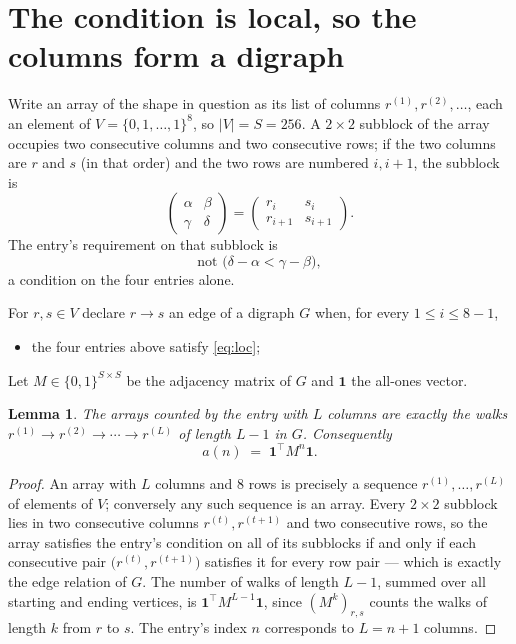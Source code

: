 \documentclass[11pt,a4paper]{article}
\theoremstyle{plain}
\newtheorem{lemma}[theorem]{Lemma}
\theoremstyle{definition}
\begin{document}
\section{The condition is local, so the columns form a digraph}

Write an array of the shape in question as its list of columns
$r^{(1)},r^{(2)},\dots$, each an element of
$V=\{0,1,\dots,1\}^{8}$, so $|V|=S=256$. A $2\times2$ subblock of the array
occupies two consecutive columns and two consecutive rows; if the two columns are $r$
and $s$ (in that order) and the two rows are numbered $i,i+1$,
the subblock is
\[
\begin{pmatrix}\alpha&\beta\\\gamma&\delta\end{pmatrix}=\begin{pmatrix}r_i&s_i\\r_{i+1}&s_{i+1}\end{pmatrix}.
\]
The entry's requirement on that subblock is
\begin{equation}\label{eq:loc}
\text{not }\bigl(\delta-\alpha<\gamma-\beta\bigr),
\end{equation}
a condition on the four entries alone.

For $r,s\in V$ declare $r\to s$ an edge of a digraph $G$ when, for every
$1\le i\le 8-1$,
\begin{itemize}
\item the four entries above satisfy \eqref{eq:loc};

\end{itemize}
Let $M\in\{0,1\}^{S\times S}$ be the adjacency matrix of $G$ and $\mathbf{1}$ the
all-ones vector.

\begin{lemma}\label{lem:walk}
The arrays counted by the entry with $L$ columns are exactly the walks
$r^{(1)}\to r^{(2)}\to\cdots\to r^{(L)}$ of length $L-1$ in $G$. Consequently
\[
a(n)\;=\;\mathbf{1}^{\!\top}M^{n}\mathbf{1} .
\]
\end{lemma}

\begin{proof}
An array with $L$ columns and $8$ rows is precisely a sequence
$r^{(1)},\dots,r^{(L)}$ of elements of $V$; conversely any such sequence is an array.
Every $2\times2$ subblock lies in two consecutive columns $r^{(t)},r^{(t+1)}$ and two
consecutive rows, so the array satisfies the entry's condition on all of its subblocks
if and only if each consecutive pair $\bigl(r^{(t)},r^{(t+1)}\bigr)$ satisfies it for
every row pair --- which is exactly the edge relation of $G$. The number of walks of
length $L-1$, summed over all starting and ending vertices, is
$\mathbf{1}^{\!\top}M^{L-1}\mathbf{1}$, since $(M^{k})_{r,s}$ counts the walks of
length $k$ from $r$ to $s$. The entry's index $n$ corresponds to $L=n+1$ columns.
\end{proof}
\end{document}
